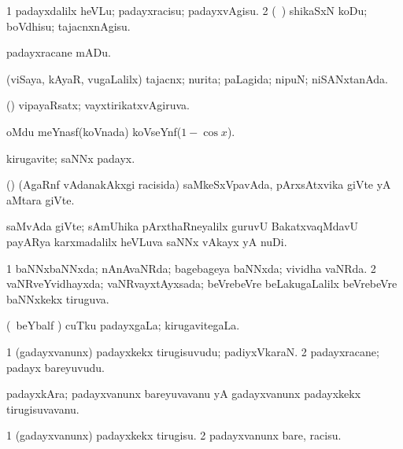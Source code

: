 {{{{\bentry
{} 
\gl{\sakirx}
\expl{}
\bmng
\bnum
\num{1} padayxdalilx heVLu; padayxracisu; padayxvAgisu. 
\num{2} (\sA\ \AtAmx) shikaSxN koDu; boVdhisu; tajacnxnAgisu. 
\enum
\emng

\noindent 
\gl{\akirx}
\expl{}
\bmng
 padayxracane mADu. 
\emng
\eentry

\bentry
{} 
\gl{\gu}
\expl{}
\bmng
 (viSaya, kAyaR, \mo vugaLalilx) tajacnx; nurita; paLagida; nipuN; niSANxtanAda. 
\emng
\eentry

\bentry
{} 
\gl{\gu}
\expl{}
\bmng
 (\ga) vipayaRsatx; vayxtirikatxvAgiruva. 
\emng
\eentry

\bentry
{}
\gl{\nA}
\expl{}
\bmng
 oMdu meYnasf(koVnada) koVseYnf($1-\cos x$). 
\emng
\eentry

\bentry
{} 
\gl{\nA}
\expl{}
\bmng
 kirugavite; saNNx padayx. 
\emng
\eentry

\bentry
{} 
\gl{\nA}
\expl{}
\bmng
 (\saM) (AgaRnf vAdanakAkxgi racisida) saMkeSxVpavAda, pArxsAtxvika giVte yA aMtara giVte. 
\emng
\eentry

\bentry 
{} 
\gl{\nA}
\expl{}
\bmng
 saMvAda giVte; sAmUhika pArxthaRneyalilx guruvU BakatxvaqMdavU payARya karxmadalilx heVLuva saNNx vAkayx yA nuDi. 
\emng
\eentry

\bentry
{} 
\gl{\gu}
\expl{}
\bmng
\bnum
\num{1} baNNxbaNNxda; nAnAvaNRda; bagebageya baNNxda; vividha vaNRda. 
\num{2} vaNRveYvidhayxda; vaNRvayxtAyxsada; beVrebeVre beLakugaLalilx beVrebeVre baNNxkekx tiruguva. 
\enum
\emng
\eentry

\bentry
{} 
\gl{\gu}
\expl{}
\bmng
 (\kanmu\ beYbalf \vi) cuTku padayxgaLa; kirugavitegaLa. 
\emng
\eentry

\bentry
{} 
\gl{\nA}
\expl{}
\bmng
\bnum
\num{1} (gadayxvanunx) padayxkekx tirugisuvudu; padiyxVkaraN. 
\num{2} padayxracane; padayx bareyuvudu. 
\enum
\emng
\eentry

\bentry
{} 
\gl{\nA}
\expl{}
\bmng
 padayxkAra; padayxvanunx bareyuvavanu yA gadayxvanunx padayxkekx tirugisuvavanu. 
\emng
\eentry

\bentry
{} 
\gl{\sakirx}
\expl{}
\bmng
\bnum
\num{1} (gadayxvanunx) padayxkekx tirugisu. 
\num{2} padayxvanunx bare, racisu. 
\enum
\emng

}}}}
